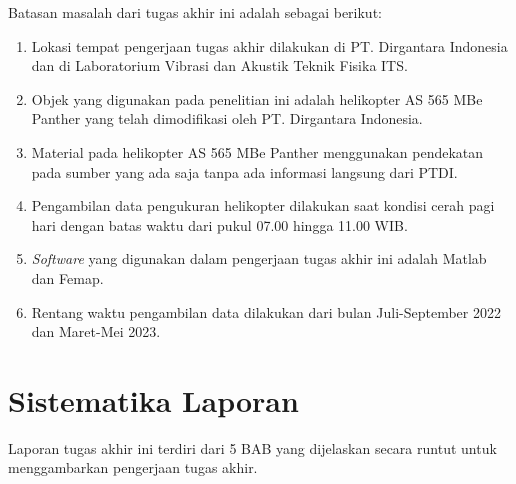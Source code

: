 Batasan masalah dari tugas akhir ini adalah sebagai berikut:

\begin{enumerate}[nolistsep]

  \item Lokasi tempat pengerjaan tugas akhir dilakukan di PT. Dirgantara Indonesia dan di Laboratorium Vibrasi dan Akustik Teknik Fisika ITS.

  \item Objek yang digunakan pada penelitian ini adalah helikopter AS 565 MBe Panther yang telah dimodifikasi oleh PT. Dirgantara Indonesia.
  
  \item Material pada helikopter AS 565 MBe Panther menggunakan pendekatan pada sumber yang ada saja tanpa ada informasi langsung dari PTDI.

  \item Pengambilan data pengukuran helikopter dilakukan saat kondisi cerah pagi hari dengan batas waktu dari pukul 07.00 hingga 11.00 WIB.
  
  \item \textit{Software} yang digunakan dalam pengerjaan tugas akhir ini adalah Matlab dan Femap.
  
  \item Rentang waktu pengambilan data dilakukan dari bulan Juli-September 2022 dan Maret-Mei 2023.

\end{enumerate}

\section{Sistematika Laporan}
\label{sec:sistematikalaporan}

Laporan tugas akhir ini terdiri dari 5 BAB yang dijelaskan secara runtut untuk menggambarkan pengerjaan tugas akhir.

